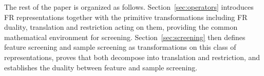 The rest of the paper is organized as follows. Section~\ref{sec:operators} introduces FR representations together with the primitive transformations including FR duality, translation and restriction acting on them, providing the common mathematical environment for screening. Section~\ref{sec:screening} then defines feature screening and sample screening as transformations on this class of representations, proves that both decompose into translation and restriction, and establishes the duality between feature and sample screening.  
